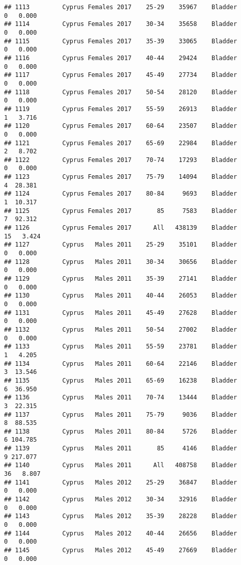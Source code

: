 \documentclass[
]{article}
\begin{document}
\begin{verbatim}
## 1113         Cyprus Females 2017    25-29    35967    Bladder      0   0.000
## 1114         Cyprus Females 2017    30-34    35658    Bladder      0   0.000
## 1115         Cyprus Females 2017    35-39    33065    Bladder      0   0.000
## 1116         Cyprus Females 2017    40-44    29424    Bladder      0   0.000
## 1117         Cyprus Females 2017    45-49    27734    Bladder      0   0.000
## 1118         Cyprus Females 2017    50-54    28120    Bladder      0   0.000
## 1119         Cyprus Females 2017    55-59    26913    Bladder      1   3.716
## 1120         Cyprus Females 2017    60-64    23507    Bladder      0   0.000
## 1121         Cyprus Females 2017    65-69    22984    Bladder      2   8.702
## 1122         Cyprus Females 2017    70-74    17293    Bladder      0   0.000
## 1123         Cyprus Females 2017    75-79    14094    Bladder      4  28.381
## 1124         Cyprus Females 2017    80-84     9693    Bladder      1  10.317
## 1125         Cyprus Females 2017       85     7583    Bladder      7  92.312
## 1126         Cyprus Females 2017      All   438139    Bladder     15   3.424
## 1127         Cyprus   Males 2011    25-29    35101    Bladder      0   0.000
## 1128         Cyprus   Males 2011    30-34    30656    Bladder      0   0.000
## 1129         Cyprus   Males 2011    35-39    27141    Bladder      0   0.000
## 1130         Cyprus   Males 2011    40-44    26053    Bladder      0   0.000
## 1131         Cyprus   Males 2011    45-49    27628    Bladder      0   0.000
## 1132         Cyprus   Males 2011    50-54    27002    Bladder      0   0.000
## 1133         Cyprus   Males 2011    55-59    23781    Bladder      1   4.205
## 1134         Cyprus   Males 2011    60-64    22146    Bladder      3  13.546
## 1135         Cyprus   Males 2011    65-69    16238    Bladder      6  36.950
## 1136         Cyprus   Males 2011    70-74    13444    Bladder      3  22.315
## 1137         Cyprus   Males 2011    75-79     9036    Bladder      8  88.535
## 1138         Cyprus   Males 2011    80-84     5726    Bladder      6 104.785
## 1139         Cyprus   Males 2011       85     4146    Bladder      9 217.077
## 1140         Cyprus   Males 2011      All   408758    Bladder     36   8.807
## 1141         Cyprus   Males 2012    25-29    36847    Bladder      0   0.000
## 1142         Cyprus   Males 2012    30-34    32916    Bladder      0   0.000
## 1143         Cyprus   Males 2012    35-39    28228    Bladder      0   0.000
## 1144         Cyprus   Males 2012    40-44    26656    Bladder      0   0.000
## 1145         Cyprus   Males 2012    45-49    27669    Bladder      0   0.000

\end{verbatim}
\end{document}
